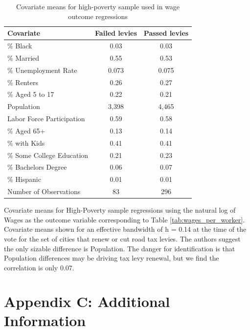 \begin{table}[!h]
    \centering
    \caption{Covariate means for high-poverty sample used in wage outcome regressions}
    \label{tab:covariate_means_wage}
    \begin{tabular}{p{4cm}cc}
        \hline
        Covariate & Failed levies & Passed levies \\
        \hline
        \% Black                & 0.03  & 0.03  \\
        \% Married              & 0.55  & 0.53  \\
        \% Unemployment Rate    & 0.073 & 0.075 \\
        \% Renters              & 0.26  & 0.27  \\
        \% Aged 5 to 17         & 0.22  & 0.21  \\
        Population              & 3,398 & 4,465 \\
        Labor Force Participation & 0.59  & 0.58  \\
        \% Aged 65+             & 0.13  & 0.14  \\
        \% with Kids            & 0.41  & 0.41  \\
        \% Some College Education & 0.21  & 0.23  \\
        \% Bachelors Degree     & 0.06  & 0.07  \\
        \% Hispanic             & 0.01  & 0.01  \\
        Number of Observations  & 83    & 296   \\
        \hline
    \end{tabular}
    \begin{tablenotes}
        \small
        \item Covariate means for High-Poverty sample regressions using the natural log of Wages as the outcome variable corresponding to Table \ref{tab:wages_per_worker}. Covariate means shown for an effective bandwidth of h = 0.14 at the time of the vote for the set of cities that renew or cut road tax levies. The authors suggest the only sizable difference is Population. The danger for identification is that Population differences may be driving tax levy renewal, but we find the correlation is only 0.07.
    \end{tablenotes}
\end{table}

\clearpage

\section{Appendix C: Additional Information} \label{sec:appxc}

